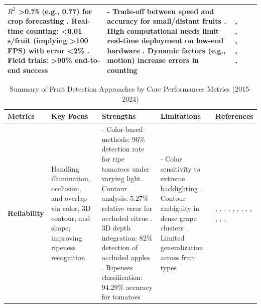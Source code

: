 \documentclass[a4paper,fleqn]{cas-dc}
\begin{document}
\begin{table}[htbp]
\begin{tabular}{@{}p{1.5cm}p{2.5cm}p{5cm}p{4cm}p{2.5cm}@{}}
$R^2$ >0.75 (e.g., 0.77) for crop forecasting \cite{underwood2016mapping}. Real-time counting: <0.01 s/fruit (implying >100 FPS) with error <2\% \cite{altaheri2019date}. Field trials: >90\% end-to-end success \cite{birrell2020field} & - Trade-off between speed and accuracy for small/distant fruits \cite{kang2020real}. High computational needs limit real-time deployment on low-end hardware \cite{altaheri2019date}. Dynamic factors (e.g., motion) increase errors in counting \cite{underwood2016mapping} & \cite{underwood2016mapping}, \cite{lin2019guava}, \cite{kang2019fruit}, \cite{kang2020real}, \cite{altaheri2019date}, \cite{birrell2020field} \\ \bottomrule
\end{tabular}
\end{table}

\iffalse
\begin{table}[htbp]
	\centering
	\footnotesize 
	\caption{Summary of Fruit Detection Approaches by Core Performances Metrics (2015-2024)} 
	\label{tab:performance-metrics} 
	\begin{tabular}{@{}p{1.5cm}p{2.5cm}p{5cm}p{4cm}p{2.5cm}@{}}
	\toprule
	\textbf{Metrics} & \textbf{Key Focus} & \textbf{Strengths} & \textbf{Limitations} & \textbf{References} \\ \midrule
	\textbf{Reliability} & Handling illumination, occlusion, and overlap via color, 3D contour, and shape; improving ripeness recognition & - Color-based methods: 96\% detection rate for ripe tomatoes under varying light \cite{zhao2016detecting}. Contour analysis: 5.27\% relative error for occluded citrus \cite{lu2015detecting}. 3D depth integration: 82\% detection of occluded apples \cite{nguyen2016detection}. Ripeness classification: 94.29\% accuracy for tomatoes \cite{goel2015fuzzy} & - Color sensitivity to extreme backlighting \cite{liu2016method}. Contour ambiguity in dense grape clusters \cite{luo2016robust}. Limited generalization across fruit types \cite{li2021novel} & \cite{nguyen2016detection}, \cite{lu2015detecting}, \cite{liu2016method}, \cite{lin2020color}, \cite{majeed2020deep}, \cite{li2021novel}, \cite{luo2016robust}, \cite{mendes2016vine}, \cite{goel2015fuzzy}, \cite{zhao2016detecting}, \cite{pourdarbani2020automatic}, \cite{zhang2018deep}, \cite{longsheng2015kiwifruit} \\ \midrule

\end{tabular}
\end{table}
\end{document}

